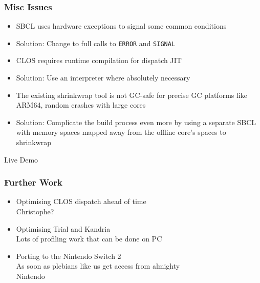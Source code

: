 \documentclass[14pt,t,aspectratio=169]{beamer}
\begin{document}
\begin{frame}
  \frametitle{Misc Issues}
  \begin{itemize}
  \item SBCL uses hardware exceptions to signal some common conditions
  \item \Rightarrow{} Solution: Change to full calls to \texttt{ERROR} and \texttt{SIGNAL}
  \item CLOS requires runtime compilation for dispatch JIT
  \item \Rightarrow{} Solution: Use an interpreter where absolutely necessary
  \item The existing shrinkwrap tool is not GC-safe for precise GC
    platforms like ARM64, random crashes with large cores
  \item  \Rightarrow{} Solution: Complicate the build process even more by using
    a separate SBCL with memory spaces mapped away from the offline
    core's spaces to shrinkwrap
  \end{itemize}
\end{frame}

\begin{frame}[c]{ }
  \centering
  {\Huge Live Demo}
\end{frame}

\begin{frame}
  \frametitle{Further Work}
  \begin{itemize}
  \item Optimising CLOS dispatch ahead of time \\
    \Rightarrow{} Christophe? 
  \item Optimising Trial and Kandria \\
    \Rightarrow{} Lots of profiling work that can be done on PC
  \item Porting to the Nintendo Switch 2 \\
    \Rightarrow{} As soon as plebians like us get access from almighty \\\quad Nintendo
  \end{itemize}
\end{frame}
\end{document}
